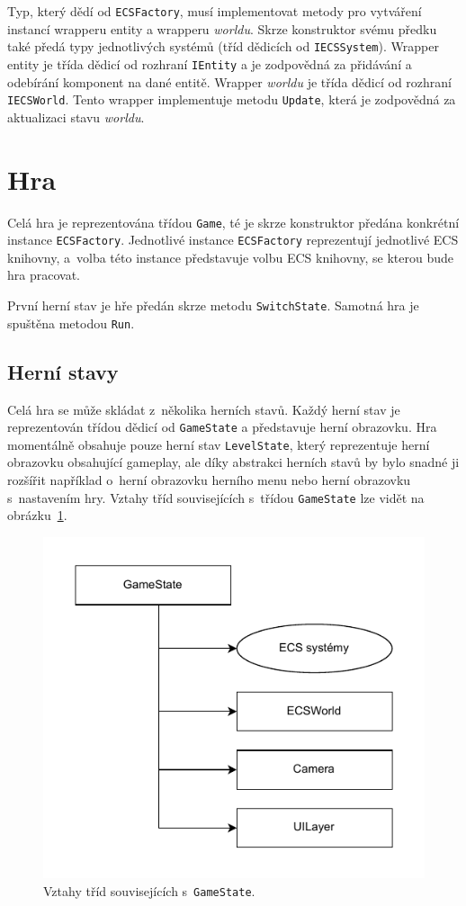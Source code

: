Typ, který dědí od \texttt{ECSFactory}, musí implementovat metody pro vytváření instancí wrapperu entity a wrapperu \textit{worldu}. Skrze konstruktor svému předku také předá typy jednotlivých systémů (tříd dědicích od \texttt{IECSSystem}). Wrapper entity je třída dědicí od rozhraní \texttt{IEntity} a je zodpovědná za přidávání a odebírání komponent na dané entitě. Wrapper \textit{worldu} je třída dědicí od rozhraní \texttt{IECSWorld}. Tento wrapper implementuje metodu \texttt{Update}, která je zodpovědná za aktualizaci stavu \textit{worldu}.

\section{Hra}
\label{sec:game-impl}
Celá hra je reprezentována třídou \texttt{Game}, té je skrze konstruktor předána konkrétní instance \texttt{ECSFactory}. Jednotlivé instance \texttt{ECSFactory} reprezentují jednotlivé ECS knihovny, a~volba této instance představuje volbu ECS knihovny, se kterou bude hra pracovat.

První herní stav je hře předán skrze metodu \texttt{SwitchState}. Samotná hra je spuštěna metodou \texttt{Run}.

\subsection{Herní stavy}
Celá hra se může skládat z~několika herních stavů. Každý herní stav je reprezentován třídou dědicí od \texttt{GameState} a představuje herní obrazovku. Hra momentálně obsahuje pouze herní stav \texttt{LevelState}, který reprezentuje herní obrazovku obsahující gameplay, ale díky abstrakci herních stavů by bylo snadné ji rozšířit například o~herní obrazovku herního menu nebo herní obrazovku s~nastavením hry. Vztahy tříd souvisejících s~třídou \texttt{GameState} lze vidět na obrázku~\ref{fig:game-state}.

\begin{figure}[!htb]
  \centering
  \includegraphics[width=0.5\linewidth]{img/game-state.pdf}
  \caption{Vztahy tříd souvisejících s~\texttt{GameState}.}
  \label{fig:game-state}
\end{figure}

